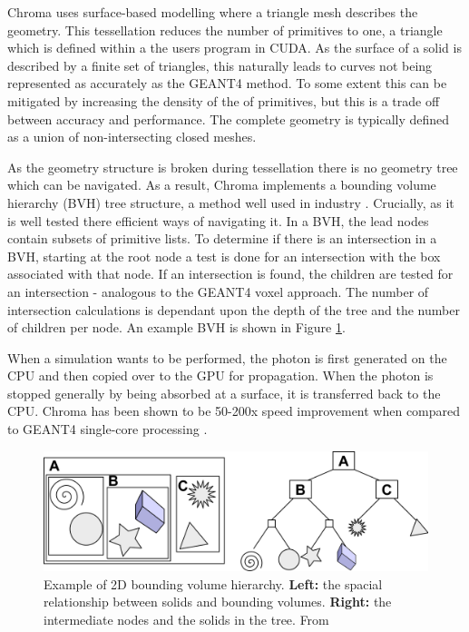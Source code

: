 Chroma uses surface-based modelling where a triangle mesh describes the geometry.
This tessellation reduces the number of primitives to one, a triangle which is defined within a the users program in CUDA.
As the surface of a solid is described by a finite set of triangles, this naturally leads to curves not being represented as accurately as the GEANT4 method.
To some extent this can be mitigated by increasing the density of the of primitives, but this is a trade off between accuracy and performance.
The complete geometry is typically defined as a union of non-intersecting closed meshes.
\par
As the geometry structure is broken during tessellation there is no geometry tree which can be navigated.
As a result, Chroma implements a bounding volume hierarchy (BVH) tree structure, a method well used in industry \cite{real_time_collision_detection_ref}.
Crucially, as it is well tested there efficient ways of navigating it.
In a BVH, the lead nodes contain subsets of primitive lists.
To determine if there is an intersection in a BVH, starting at the root node a test is done for an intersection with the box associated with that node.
If an intersection is found, the children are tested for an intersection - analogous to the GEANT4 voxel approach.
The number of intersection calculations is dependant upon the depth of the tree and the number of children per node.
An example BVH is shown in Figure \ref{fig:bvh_example}.
\par
When a simulation wants to be performed, the photon is first generated on the CPU and then copied over to the GPU for propagation.
When the photon is stopped generally by being absorbed at a surface, it is transferred back to the CPU.
Chroma has been shown to be 50-200x speed improvement when compared to GEANT4 single-core processing \cite{chroma_whitepaper_ref,chroma_presentation_ref}.
\begin{figure}[!htbp]
    \centering
    \includegraphics[width=\textwidth]{Figures/Simulations/bounding_volume_hierarchy.png}
    \caption{Example of 2D bounding volume hierarchy. 
             \textbf{Left:} the spacial relationship between solids and bounding volumes.
             \textbf{Right:} the intermediate nodes and the solids in the tree.
             From \cite{bounding_box_ref}}
    \label{fig:bvh_example}
\end{figure}
